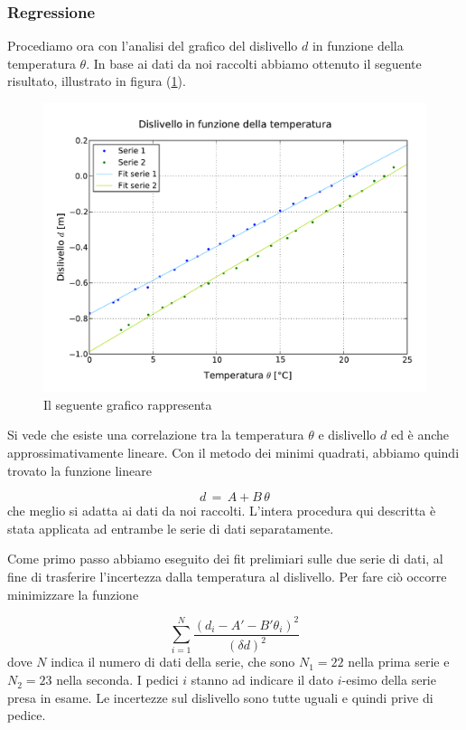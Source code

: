 \subsubsection{Regressione}

Procediamo ora con l'analisi del grafico del dislivello $d$ in funzione della temperatura $\theta$.
In base ai dati da noi raccolti abbiamo ottenuto il seguente risultato, illustrato in figura (\ref{fig:dislivello_temperatura}).

\begin{figure}
    \centering
    \includegraphics[width=120mm]{immagini/dislivello_temperatura.pdf}
    \caption{Il seguente grafico rappresenta}
    \label{fig:dislivello_temperatura}
\end{figure}
%
Si vede che esiste una correlazione tra la temperatura $\theta$ e dislivello $d$ ed è anche approssimativamente lineare.
Con il metodo dei minimi quadrati, abbiamo quindi trovato la funzione lineare

\begin{equation}
	d \,=\, A + B\,\theta
	\label{h_theta}
\end{equation}
%
che meglio si adatta ai dati da noi raccolti. L'intera procedura qui descritta è stata
applicata ad entrambe le serie di dati separatamente.

Come primo passo abbiamo eseguito dei fit prelimiari sulle due serie di dati,
al fine di trasferire l'incertezza dalla temperatura al dislivello.
Per fare ciò occorre minimizzare la funzione

\begin{equation}
    \sum_{i=1}^{N} \frac{(d_i - A' - B'\theta_i)^2}{(\delta d)^2}
    \label{eq:min_quad}
\end{equation}
%
dove $N$ indica il numero di dati della serie, che sono $N_1 = 22$ nella prima serie e $N_2 = 23$ nella seconda.
I pedici $i$ stanno ad indicare il dato $i$-esimo della serie presa in esame. Le incertezze sul dislivello sono tutte uguali e
quindi prive di pedice.

